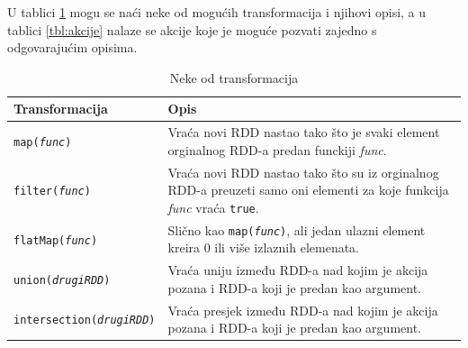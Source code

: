 \documentclass[times, utf8, zavrsni]{fer}
\begin{document}
U tablici \ref{tbl:transformacije} mogu se naći neke od mogućih transformacija i njihovi opisi, a u tablici \ref{tbl:akcije} nalaze se akcije koje je moguće pozvati zajedno s odgovarajućim opisima.
\begin{table}[htb]
\caption{Neke od transformacija}
\label{tbl:transformacije}
\centering
\begin{tabular}{lp{10cm}} 
\hline
Transformacija & Opis \\
\hline
\texttt{map(\emph{func})} & Vraća novi RDD nastao tako što je svaki element orginalnog RDD-a predan funckiji \emph{func}. \\
\texttt{filter(\emph{func})} & Vraća novi RDD nastao tako što su iz orginalnog RDD-a preuzeti samo oni elementi za koje funkcija \emph{func} vraća \texttt{true}. \\
\texttt{flatMap(\emph{func})} & Slično kao \texttt{map(\emph{func})}, ali jedan ulazni element kreira 0 ili više izlaznih elemenata. \\
\texttt{union(\emph{drugiRDD})} & Vraća uniju između RDD-a nad kojim je akcija pozana i RDD-a koji je predan kao argument. \\
\texttt{intersection(\emph{drugiRDD})} & Vraća presjek između RDD-a nad kojim je akcija pozana i RDD-a koji je predan kao argument. \\
\hline
\end{tabular}
\end{table}
\end{document}
